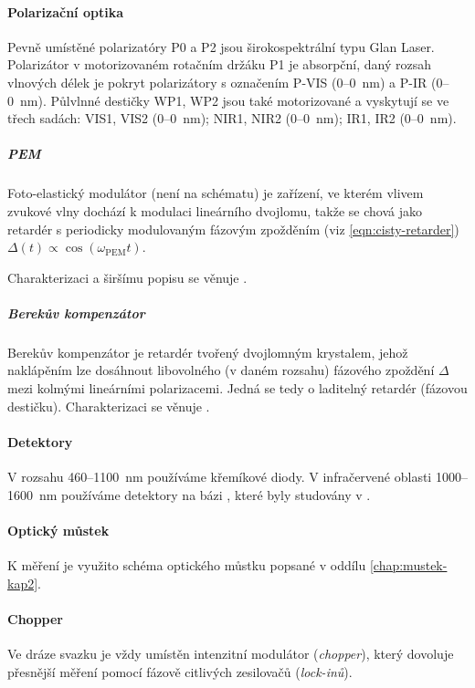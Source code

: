 \paragraph{Polarizační optika}
Pevně umístěné polarizatóry P0 a P2 jsou širokospektrální typu Glan Laser.
Polarizátor v motorizovaném rotačním držáku P1 je absorpční, daný rozsah vlnových délek je pokryt polarizátory s označením P-VIS (\num{0}--\SI{0}{\nano\meter}) a P-IR (\num{0}--\SI{0}{\nano\meter}).
Půlvlnné destičky WP1, WP2 jsou také motorizované a vyskytují se ve třech sadách: VIS1, VIS2 (\num{0}--\SI{0}{\nano\meter}); NIR1, NIR2 (\num{0}--\SI{0}{\nano\meter}); IR1, IR2 (\num{0}--\SI{0}{\nano\meter}).

\subparagraph{PEM}
Foto-elastický modulátor (není na schématu) je zařízení, ve kterém vlivem zvukové vlny dochází k modulaci lineárního dvojlomu,
takže se chová jako retardér s periodicky modulovaným fázovým zpožděním (viz \eqref{eqn:cisty-retarder}) $\Delta(t) \propto \cos(\omega_\textrm{PEM}t)$. 

Charakterizaci a širšímu popisu se věnuje \cite{minarModulacePolarizaceSvetelne2004}.

\subparagraph{Berekův kompenzátor}
Berekův kompenzátor je retardér tvořený dvojlomným krystalem, jehož naklápěním lze dosáhnout libovolného (v daném rozsahu) fázového zpoždění $\Delta$ mezi kolmými lineárními polarizacemi.
Jedná se tedy o laditelný retardér (fázovou destičku).
Charakterizaci se věnuje \cite{schusserSkryteKouzloPolarizace2014}.

\paragraph{Detektory}
V rozsahu \num{460}--\SI{1100}{\nano\meter} používáme křemíkové diody.
V infračervené oblasti \num{1000}--\SI{1600}{\nano\meter} používáme detektory na bázi , které byly studovány v \cite{hovorakovaCharakterizaceInfracervenehoDetektoru}.

\paragraph{Optický můstek}
K měření je využito schéma optického můstku popsané v oddílu \ref{chap:mustek-kap2}.

\paragraph{Chopper}
Ve dráze svazku je vždy umístěn intenzitní modulátor (\emph{chopper}), který dovoluje přesnější měření pomocí fázově citlivých zesilovačů (\emph{lock-inů}).
